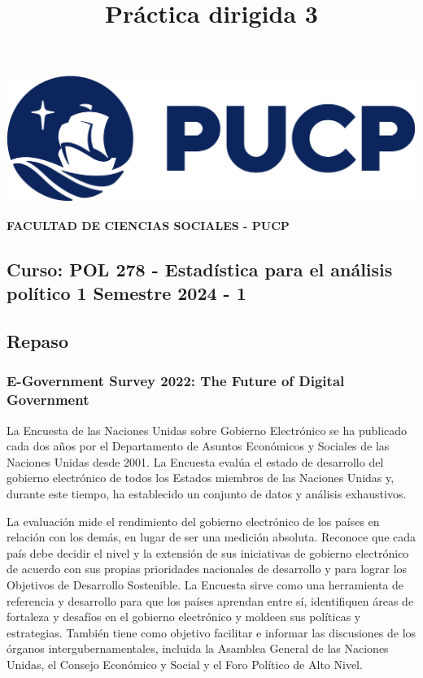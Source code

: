 \documentclass[
]{article}
\title{Práctica dirigida 3}
\author{}
\date{\vspace{-2.5em}}
\begin{document}
\maketitle

{
\setcounter{tocdepth}{1}
\tableofcontents
}
\includegraphics[width=0.3\linewidth]{logoPUCP}

\textbf{FACULTAD DE CIENCIAS SOCIALES - PUCP}

\hypertarget{curso-pol-278---estaduxedstica-para-el-anuxe1lisis-poluxedtico-1-semestre-2024---1}{%
\subsection{\texorpdfstring{Curso: POL 278 - Estadística para el
análisis político 1 \textbar{} Semestre 2024 - 1
}{Curso: POL 278 - Estadística para el análisis político 1 \textbar{} Semestre 2024 - 1  }}\label{curso-pol-278---estaduxedstica-para-el-anuxe1lisis-poluxedtico-1-semestre-2024---1}}

\hypertarget{repaso}{%
\subsection{\texorpdfstring{\textbf{Repaso}}{Repaso}}\label{repaso}}

\hypertarget{e-government-survey-2022-the-future-of-digital-government}{%
\subsubsection{\texorpdfstring{\textbf{E-Government Survey 2022: The
Future of Digital
Government}}{E-Government Survey 2022: The Future of Digital Government}}\label{e-government-survey-2022-the-future-of-digital-government}}

La Encuesta de las Naciones Unidas sobre Gobierno Electrónico se ha
publicado cada dos años por el Departamento de Asuntos Económicos y
Sociales de las Naciones Unidas desde 2001. La Encuesta evalúa el estado
de desarrollo del gobierno electrónico de todos los Estados miembros de
las Naciones Unidas y, durante este tiempo, ha establecido un conjunto
de datos y análisis exhaustivos.

La evaluación mide el rendimiento del gobierno electrónico de los países
en relación con los demás, en lugar de ser una medición absoluta.
Reconoce que cada país debe decidir el nivel y la extensión de sus
iniciativas de gobierno electrónico de acuerdo con sus propias
prioridades nacionales de desarrollo y para lograr los Objetivos de
Desarrollo Sostenible. La Encuesta sirve como una herramienta de
referencia y desarrollo para que los países aprendan entre sí,
identifiquen áreas de fortaleza y desafíos en el gobierno electrónico y
moldeen sus políticas y estrategias. También tiene como objetivo
facilitar e informar las discusiones de los órganos
intergubernamentales, incluida la Asamblea General de las Naciones
Unidas, el Consejo Económico y Social y el Foro Político de Alto Nivel.
\end{document}
